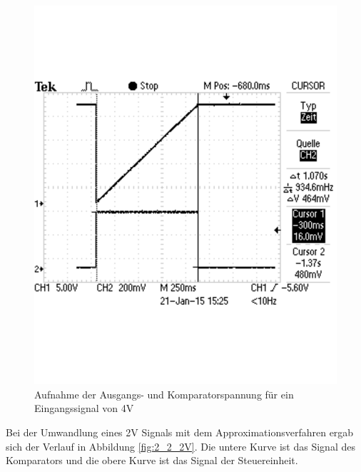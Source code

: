 \documentclass[12pt,a4paper]{article}
\begin{document}
\begin{figure}[H]
  \centering 	
    \includegraphics[trim = 0mm 50mm 0mm 50mm, clip, scale = 0.4]{2_1_4V.pdf}
  	\caption[Aufnahme der Ausgangs- und Komparatorspannung für ein Eingangssignal von 4V]{Aufnahme der Ausgangs- und Komparatorspannung für ein Eingangssignal von 4V} 
  \label{fig:2_1_4V}
\end{figure}

Bei der Umwandlung eines 2V Signals mit dem Approximationsverfahren ergab sich der Verlauf in Abbildung \ref{fig:2_2_2V}. Die untere Kurve ist das Signal des Komparators und die obere Kurve ist das Signal der Steuereinheit.
\end{document}

